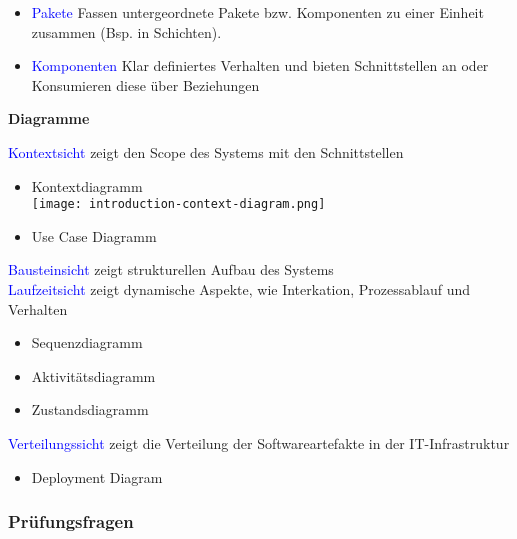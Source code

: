 \begin{itemize}
    \item \textcolor{blue}{Pakete} Fassen untergeordnete Pakete bzw. Komponenten zu einer Einheit zusammen (Bsp. in Schichten).
    \item \textcolor{blue}{Komponenten} Klar definiertes Verhalten und bieten Schnittstellen an oder Konsumieren diese über Beziehungen
\end{itemize}
\vspace{10pt}
\textbf{Diagramme}

\textcolor{blue}{Kontextsicht} zeigt den Scope des Systems mit den Schnittstellen

\begin{itemize}
    \item Kontextdiagramm \\
    \texttt{[image: introduction-context-diagram.png]}
    \item Use Case Diagramm
\end{itemize}
\vspace{10pt}
\textcolor{blue}{Bausteinsicht} zeigt strukturellen Aufbau des Systems \\

\textcolor{blue}{Laufzeitsicht} zeigt dynamische Aspekte, wie Interkation, Prozessablauf und Verhalten

\begin{itemize}
    \item Sequenzdiagramm
    \item Aktivitätsdiagramm
    \item Zustandsdiagramm
\end{itemize}
\vspace{10pt}
\textcolor{blue}{Verteilungssicht} zeigt die Verteilung der Softwareartefakte in der IT-Infrastruktur

\begin{itemize}
    \item Deployment Diagram
\end{itemize}

\columnbreak
\subsubsection{Prüfungsfragen}

